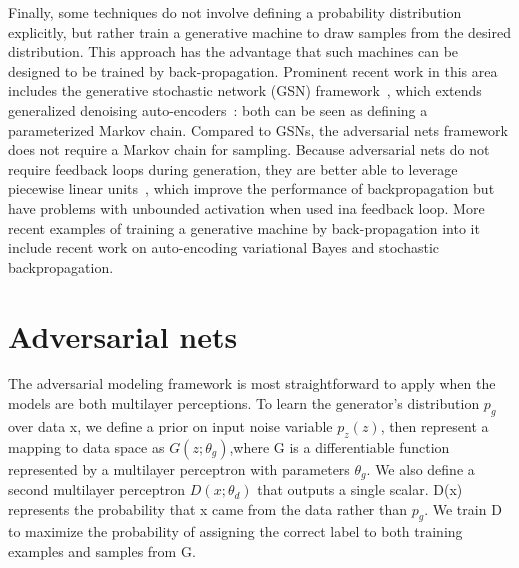 \documentclass[10pt,twocolumn,letterpaper]{article}
\begin{document}
\par Finally, some techniques do not involve defining a probability distribution explicitly, but rather train a generative machine to draw samples from the desired distribution. This approach has the advantage that such machines can be designed to be trained by back-propagation. Prominent recent work in this area includes the generative stochastic network (GSN) framework~\cite{Bengio2014Deep}, which extends generalized denoising auto-encoders~\cite{Bengio2013Generalized}: both can be seen as defining a parameterized Markov chain. Compared to GSNs, the adversarial nets framework does not require a Markov chain for sampling. Because adversarial nets do not require feedback loops during generation, they are better able to leverage piecewise linear units~\cite{Jarrett2010What}, which improve the performance of backpropagation but have problems with unbounded activation when used ina feedback loop. More recent examples of training a generative machine by back-propagation into it include recent work on auto-encoding variational Bayes and stochastic backpropagation.
\section{Adversarial nets}
\par The adversarial modeling framework is most straightforward to apply when the models are both multilayer perceptions. To learn the generator's distribution $p_{g}$ over data x, we define a prior on input noise variable $p_{z}(z)$, then represent a mapping to data space as $G(z;\theta_{g})$,where G is a differentiable function represented by a multilayer perceptron with parameters $\theta_{g}$. We also define a second multilayer perceptron $D(x;\theta_{d})$ that outputs a single scalar. D(x) represents the probability that x came from the data rather than $p_{g}$. We train D to maximize the probability of assigning the correct label to both training examples and samples from G.
  
 
\end{document}
